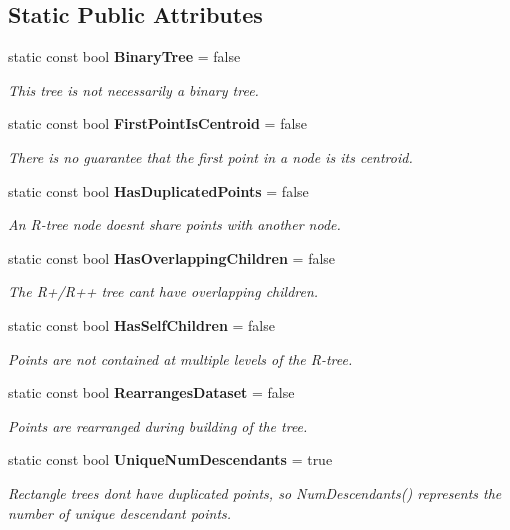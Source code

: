 \subsection*{Static Public Attributes}
\begin{DoxyCompactItemize}
\item 
static const bool \textbf{ Binary\+Tree} = false
\begin{DoxyCompactList}\small\item\em This tree is not necessarily a binary tree. \end{DoxyCompactList}\item 
static const bool \textbf{ First\+Point\+Is\+Centroid} = false
\begin{DoxyCompactList}\small\item\em There is no guarantee that the first point in a node is its centroid. \end{DoxyCompactList}\item 
static const bool \textbf{ Has\+Duplicated\+Points} = false
\begin{DoxyCompactList}\small\item\em An R-\/tree node doesn\textquotesingle{}t share points with another node. \end{DoxyCompactList}\item 
static const bool \textbf{ Has\+Overlapping\+Children} = false
\begin{DoxyCompactList}\small\item\em The R+/\+R++ tree can\textquotesingle{}t have overlapping children. \end{DoxyCompactList}\item 
static const bool \textbf{ Has\+Self\+Children} = false
\begin{DoxyCompactList}\small\item\em Points are not contained at multiple levels of the R-\/tree. \end{DoxyCompactList}\item 
static const bool \textbf{ Rearranges\+Dataset} = false
\begin{DoxyCompactList}\small\item\em Points are rearranged during building of the tree. \end{DoxyCompactList}\item 
static const bool \textbf{ Unique\+Num\+Descendants} = true
\begin{DoxyCompactList}\small\item\em Rectangle trees don\textquotesingle{}t have duplicated points, so Num\+Descendants() represents the number of unique descendant points. \end{DoxyCompactList}\end{DoxyCompactItemize}


